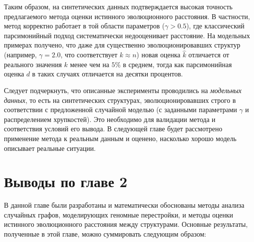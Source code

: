 Таким образом, на синтетических данных подтверждается высокая точность предлагаемого метода оценки истинного эволюционного расстояния. В частности, метод корректно работает в той области параметров ($\gamma > 0.5$), где классический парсимонийный подход систематически недооценивает расстояние. На модельных примерах получено, что даже для существенно эволюционировавших структур (например, $\gamma = 2.0$, что соответствует $k \approx n$) новая оценка $\hat{k}$ отличается от реального значения $k$ менее чем на $5\%$ в среднем, тогда как парсимонийная оценка $d$ в таких случаях отличается на десятки процентов. 

Следует подчеркнуть, что описанные эксперименты проводились на \emph{модельных данных}, то есть на синтетических структурах, эволюционировавших строго в соответствии с предложенной случайной моделью (с заданными параметрами $\gamma$ и распределением хрупкостей). Это необходимо для валидации метода и соответствия условий его вывода. В следующей главе будет рассмотрено применение метода к реальным данным и оценено, насколько хорошо модель описывает реальные ситуации.

\section*{Выводы по главе 2}

В данной главе были разработаны и математически обоснованы методы анализа случайных графов, моделирующих геномные перестройки, и методы оценки истинного эволюционного расстояния между структурами. Основные результаты, полученные в этой главе, можно суммировать следующим образом:

